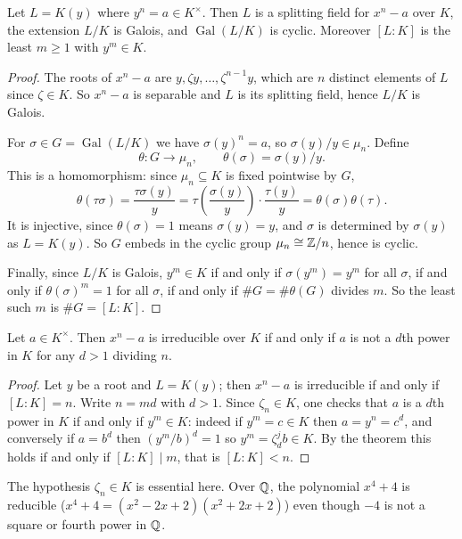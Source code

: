 \documentclass[a4paper]{scrartcl}
\newcommand{\Gal}{\operatorname{Gal}}
\begin{document}
\begin{theorem}\label{thm:kummer1}
	Let $L = K(y)$ where $y^n = a \in K^\times$. Then $L$ is a splitting field for $x^n-a$ over $K$, the extension $L/K$ is Galois, and $\Gal(L/K)$ is cyclic. Moreover $[L:K]$ is the least $m \geq 1$ with $y^m \in K$.
\end{theorem}

\begin{proof}
	The roots of $x^n - a$ are $y, \zeta y, \dots, \zeta^{n-1}y$, which are $n$ distinct elements of $L$ since $\zeta \in K$. So $x^n-a$ is separable and $L$ is its splitting field, hence $L/K$ is Galois.

	For $\sigma \in G = \Gal(L/K)$ we have $\sigma(y)^n = a$, so $\sigma(y)/y \in \mu_n$. Define
	$$\theta : G \to \mu_n, \qquad \theta(\sigma) = \sigma(y)/y.$$
	This is a homomorphism: since $\mu_n \subseteq K$ is fixed pointwise by $G$,
	$$\theta(\tau\sigma) = \frac{\tau\sigma(y)}{y} = \tau\!\left(\frac{\sigma(y)}{y}\right)\cdot\frac{\tau(y)}{y} = \theta(\sigma)\theta(\tau).$$
	It is injective, since $\theta(\sigma) = 1$ means $\sigma(y) = y$, and $\sigma$ is determined by $\sigma(y)$ as $L = K(y)$. So $G$ embeds in the cyclic group $\mu_n \cong \mathbb{Z}/n$, hence is cyclic.

	Finally, since $L/K$ is Galois, $y^m \in K$ if and only if $\sigma(y^m) = y^m$ for all $\sigma$, if and only if $\theta(\sigma)^m = 1$ for all $\sigma$, if and only if $\#G = \#\theta(G)$ divides $m$. So the least such $m$ is $\#G = [L:K]$.
\end{proof}

\begin{corollary}\label{cor:xnairred}
	Let $a \in K^\times$. Then $x^n - a$ is irreducible over $K$ if and only if $a$ is not a $d$th power in $K$ for any $d > 1$ dividing $n$.
\end{corollary}

\begin{proof}
	Let $y$ be a root and $L = K(y)$; then $x^n-a$ is irreducible if and only if $[L:K] = n$. Write $n = md$ with $d > 1$. Since $\zeta_n \in K$, one checks that $a$ is a $d$th power in $K$ if and only if $y^m \in K$: indeed if $y^m = c \in K$ then $a = y^n = c^d$, and conversely if $a = b^d$ then $(y^m/b)^d = 1$ so $y^m = \zeta_d^j b \in K$. By the theorem this holds if and only if $[L:K] \mid m$, that is $[L:K] < n$.
\end{proof}

\begin{remark}
	The hypothesis $\zeta_n \in K$ is essential here. Over $\mathbb{Q}$, the polynomial $x^4+4$ is reducible ($x^4+4 = (x^2-2x+2)(x^2+2x+2)$) even though $-4$ is not a square or fourth power in $\mathbb{Q}$.
\end{remark}
\end{document}
